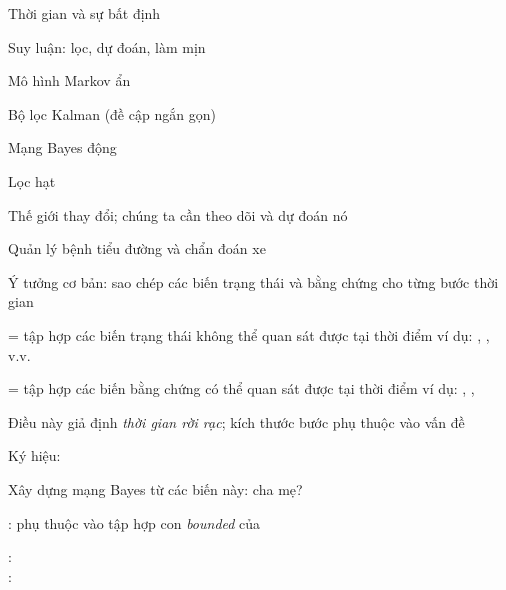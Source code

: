 \documentclass{article}
\begin{document}
\begin{huge}

\sf


\blob Thời gian và sự bất định

\blob Suy luận: lọc, dự đoán, làm mịn

\blob Mô hình Markov ẩn

\blob Bộ lọc Kalman (đề cập ngắn gọn)

\blob Mạng Bayes động

\blob Lọc hạt



Thế giới thay đổi; chúng ta cần theo dõi và dự đoán nó

Quản lý bệnh tiểu đường và chẩn đoán xe

Ý tưởng cơ bản: sao chép các biến trạng thái và bằng chứng cho từng bước thời gian

 = tập hợp các biến trạng thái không thể quan sát được tại thời điểm \nl
    ví dụ: , , v.v.

 = tập hợp các biến bằng chứng có thể quan sát được tại thời điểm \al
    ví dụ: , , 

Điều này giả định \emph{thời gian rời rạc}; kích thước bước phụ thuộc vào vấn đề

Ký hiệu: 



Xây dựng mạng Bayes từ các biến này: cha mẹ?

:  phụ thuộc vào tập hợp con \emph{bounded} của 

: \\
: 

\vspace*{0.2in}


\end{huge}
\end{document}
